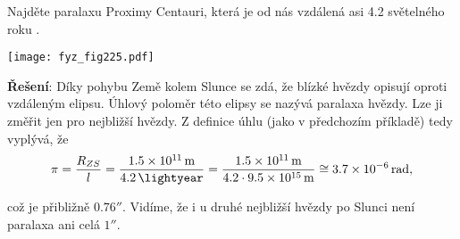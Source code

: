 \wikitextrule
\begin{example}\label{FYZ:exam006}
  Najděte paralaxu Proximy Centauri, která je od nás vzdálená asi \num{4.2} světelného roku 
  \protect\cite[s.~4]{Kulhanek2009}.
  
   {\centering
    \captionsetup{type=figure}
    \texttt{[image: fyz\_fig225.pdf]}
    \label{fyz:fig225}
    \par}
    
  \textbf{Řešení}: Díky pohybu Země kolem Slunce se zdá, že blízké hvězdy opisují oproti 
  vzdáleným elipsu. Úhlový poloměr této elipsy se nazývá paralaxa hvězdy. Lze ji změřit jen pro 
  nejbližší hvězdy. Z definice úhlu (jako v předchozím příkladě) tedy vyplývá, že
  \begin{equation*}
    \pi = \frac{R_{ZS}}{l} = \frac{\SI{1.5e11}{\meter}}{\SI{4.2}{\lightyear}} 
        = \frac{\SI{1.5e11}{\meter}}{\num{4,2}\cdot\SI{9.5e15}{\meter}}
          \cong \SI{3,7e-6}{\radian},
  \end{equation*}
  
  což je přibližně \(\ang{;;0,76}\). Vidíme, že i u druhé nejbližší hvězdy po Slunci není 
  paralaxa ani celá \(\ang{;;1}\).
\end{example}
\wikitextrule